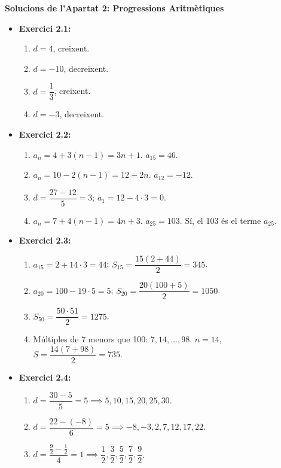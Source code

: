 \documentclass[12pt]{article}
\begin{document}
\begin{solucio}
\textbf{Solucions de l'Apartat 2: Progressions Aritmètiques}
\begin{itemize}
    \item \textbf{Exercici 2.1:}
    \begin{enumerate}[label=\alph*)]
        \item $d = 4$, creixent.
        \item $d = -10$, decreixent.
        \item $d = \dfrac{1}{3}$, creixent.
        \item $d = -3$, decreixent.
    \end{enumerate}
    \item \textbf{Exercici 2.2:}
    \begin{enumerate}[label=\alph*)]
        \item $a_n = 4 + 3(n-1) = 3n + 1$. $a_{15} = 46$.
        \item $a_n = 10 - 2(n-1) = 12 - 2n$. $a_{12} = -12$.
        \item $d = \dfrac{27-12}{5} = 3$; $a_1 = 12 - 4 \cdot 3 = 0$.
        \item $a_n = 7 + 4(n-1) = 4n + 3$. $a_{25} = 103$. Sí, el 103 és el terme $a_{25}$.
    \end{enumerate}
    \item \textbf{Exercici 2.3:}
    \begin{enumerate}[label=\alph*)]
        \item $a_{15} = 2 + 14 \cdot 3 = 44$; $S_{15} = \dfrac{15(2+44)}{2} = 345$.
        \item $a_{20} = 100 - 19 \cdot 5 = 5$; $S_{20} = \dfrac{20(100+5)}{2} = 1050$.
        \item $S_{50} = \dfrac{50 \cdot 51}{2} = 1275$.
        \item Múltiples de 7 menors que 100: $7, 14, \dots, 98$. $n = 14$, $S = \dfrac{14(7+98)}{2} = 735$.
    \end{enumerate}
    \item \textbf{Exercici 2.4:}
    \begin{enumerate}[label=\alph*)]
        \item $d = \dfrac{30-5}{5} = 5 \implies 5, 10, 15, 20, 25, 30$.
        \item $d = \dfrac{22-(-8)}{6} = 5 \implies -8, -3, 2, 7, 12, 17, 22$.
        \item $d = \dfrac{\frac{9}{2} - \frac{1}{2}}{4} = 1 \implies \dfrac{1}{2}, \dfrac{3}{2}, \dfrac{5}{2}, \dfrac{7}{2}, \dfrac{9}{2}$.
    \end{enumerate}
\end{itemize}
\end{solucio}
\end{document}
